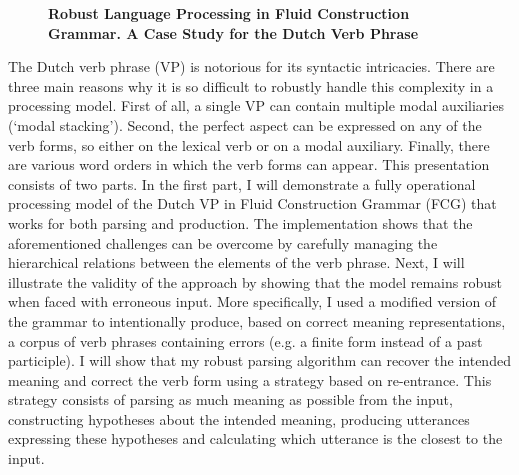 \documentclass[10pt, a4paper, twopage, headinclude, footinclude, BCOR5mm]{book}
\begin{document}
\newpage

\begin{figure}[t!]
\centering
\large\textbf{Robust Language Processing in Fluid Construction Grammar. A Case Study for the Dutch Verb Phrase}
\vspace*{0.5cm}
\end{figure}


\begin{table}[t!]
\end{table} 
\noindent
The Dutch verb phrase (VP) is notorious for its syntactic intricacies. There are three main reasons why it is so difficult to robustly handle this complexity in a processing model. First of all, a single VP can contain multiple modal auxiliaries (‘modal stacking’). Second, the perfect aspect can be expressed on any of the verb forms, so either on the lexical verb or on a modal auxiliary. Finally, there are various word orders in which the verb forms can appear.   This presentation consists of two parts. In the first part, I will demonstrate a fully operational processing model of the Dutch VP in Fluid Construction Grammar (FCG) that works for both parsing and production. The implementation shows that the aforementioned challenges can be overcome by carefully managing the hierarchical relations between the elements of the verb phrase. Next, I will illustrate the validity of the approach by showing that the model remains robust when faced with erroneous input. More specifically, I used a modified version of the grammar to intentionally produce, based on correct meaning representations, a corpus of verb phrases containing errors (e.g. a finite form instead of a past participle). I will show that my robust parsing algorithm can recover the intended meaning and correct the verb form using a strategy based on re-entrance. This strategy consists of parsing as much meaning as possible from the input, constructing hypotheses about the intended meaning, producing utterances expressing these hypotheses and calculating which utterance is the closest to the input.   
\end{document}
